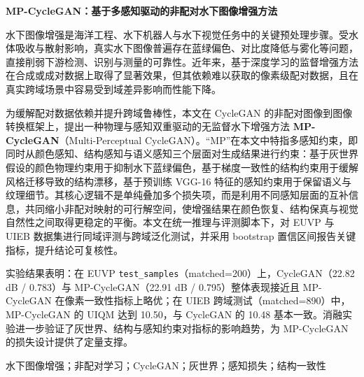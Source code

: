 \documentclass[a4paper,zihao=-4,linespread=1.25]{ctexart}
\newcommand{\thesistitle}[1]{
    \begin{center}
        {\zihao{-3}\bfseries\songti #1} %
    \end{center}
}
\begin{document}
\thesistitle{MP-CycleGAN：基于多感知驱动的非配对水下图像增强方法}

\vspace{\baselineskip} %

\noindent\hspace{2em}{\bfseries 摘要：}
{
水下图像增强是海洋工程、水下机器人与水下视觉任务中的关键预处理步骤。受水体吸收与散射影响，真实水下图像普遍存在蓝绿偏色、对比度降低与雾化等问题，直接削弱下游检测、识别与测量的可靠性。近年来，基于深度学习的监督增强方法在合成或成对数据上取得了显著效果，但其依赖难以获取的像素级配对数据，且在真实跨域场景中容易受到域差异影响而性能下降。

为缓解配对数据依赖并提升跨域鲁棒性，本文在 CycleGAN 的非配对图像到图像转换框架上，提出一种物理与感知双重驱动的无监督水下增强方法 \textbf{MP-CycleGAN}（Multi-Perceptual CycleGAN）。“MP”在本文中特指多感知约束，即同时从颜色感知、结构感知与语义感知三个层面对生成结果进行约束：基于灰世界假设的颜色物理约束用于抑制水下蓝绿偏色，基于梯度一致性的结构约束用于缓解风格迁移导致的结构漂移，基于预训练 VGG-16 特征的感知约束用于保留语义与纹理细节。其核心逻辑不是单纯叠加多个损失项，而是利用不同感知层面的互补信息，共同缩小非配对映射的可行解空间，使增强结果在颜色恢复、结构保真与视觉自然性之间取得更稳定的平衡。本文在统一推理与评测脚本下，对 EUVP 与 UIEB 数据集进行同域评测与跨域泛化测试，并采用 bootstrap 置信区间报告关键指标，提升结论可复核性。

实验结果表明：在 EUVP \texttt{test\_samples}（matched=200）上，CycleGAN（22.82 dB / 0.783）与 MP-CycleGAN（22.91 dB / 0.795）整体表现接近且 MP-CycleGAN 在像素一致性指标上略优；在 UIEB 跨域测试（matched=890）中，MP-CycleGAN 的 UIQM 达到 10.50，与 CycleGAN 的 10.48 基本一致。消融实验进一步验证了灰世界、结构与感知约束对指标的影响趋势，为 MP-CycleGAN 的损失设计提供了定量支撑。
}

\vspace{\baselineskip}

\noindent\hspace{2em}{\bfseries 关键词：}水下图像增强；非配对学习；CycleGAN；灰世界；感知损失；结构一致性

\vspace{\baselineskip}
\end{document}
